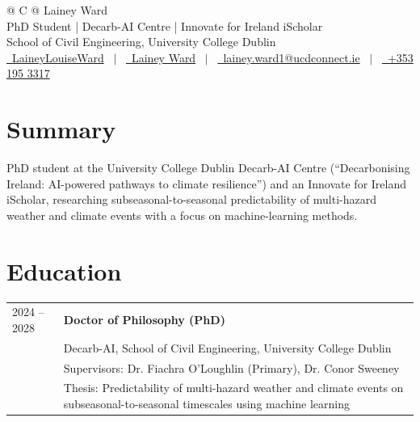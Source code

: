 \documentclass[a4paper,12pt]{article}
\begin{document}
\pagestyle{empty}
{\selectfont

\begin{tabularx}{\linewidth}{@{} C @{}}
\Huge{Lainey Ward} \\[6pt]

PhD Student | Decarb-AI Centre | Innovate for Ireland iScholar \\[3pt]
School of Civil Engineering, University College Dublin \\[6pt]

\href{https://github.com/LaineyLouiseWard}{\raisebox{-0.05\height}\faGithub\ LaineyLouiseWard}
\ $|$ \
\href{https://linkedin.com/in/lainey-ward-482821388}{\raisebox{-0.05\height}\faLinkedin\ Lainey Ward}
\ $|$ \
\href{mailto:lainey.ward1@ucdconnect.ie}{\raisebox{-0.05\height}\faEnvelope\ lainey.ward1@ucdconnect.ie}
\ $|$ \
\href{tel:+353851953317}{\raisebox{-0.05\height}\faMobile\ +353 195 3317}
\end{tabularx}

\section{Summary}

PhD student at the University College Dublin Decarb-AI Centre (“Decarbonising Ireland: AI-powered pathways to climate resilience”) and an Innovate for Ireland iScholar, researching subseasonal-to-seasonal predictability of multi-hazard weather and climate events with a focus on machine-learning methods.
\par\vspace{10pt}
\section{Education}

\begin{tabularx}{\linewidth}{@{}l X@{}}
2024 -- 2028 &
\textbf{Doctor of Philosophy (PhD)} \\
& Decarb-AI, School of Civil Engineering, University College Dublin \\
& Supervisors: Dr. Fiachra O'Loughlin (Primary), Dr. Conor Sweeney \\
& Thesis: Predictability of multi-hazard weather and climate events on subseasonal-to-seasonal timescales using machine learning \\


\end{tabularx}}
\end{document}
